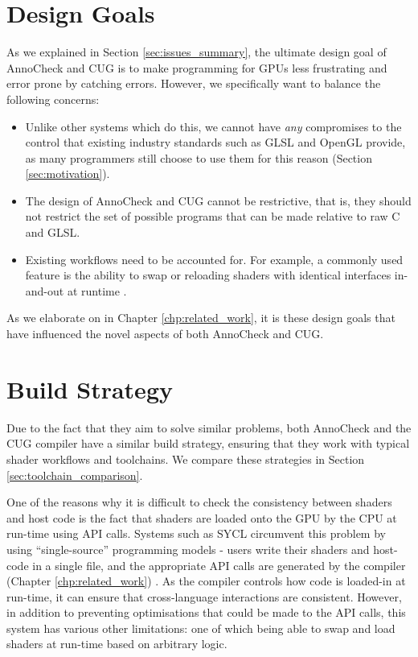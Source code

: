 \documentclass[a4paper,12pt,twoside,openright]{report}
\begin{document}
\section{Design Goals}

As we explained in Section \ref{sec:issues_summary}, the ultimate design goal
of AnnoCheck and CUG is to make programming for GPUs less frustrating and error
prone by catching errors. However, we specifically want to balance the
following concerns:

\begin{itemize}

    \item Unlike other systems which do this, we cannot have \textit{any}
    compromises to the control that existing industry standards such as GLSL
    and OpenGL provide, as many programmers still choose to use them for this
    reason (Section \ref{sec:motivation}).

    \item The design of AnnoCheck and CUG cannot be restrictive, that is, they
    should not restrict the set of possible programs that can be made relative
    to raw C and GLSL.

    \item Existing workflows need to be accounted for. For example, a commonly
    used feature is the ability to swap or reloading shaders with identical
    interfaces in-and-out at runtime \cite{HotloadShader}.

\end{itemize}

As we elaborate on in Chapter \ref{chp:related_work}, it is these design goals
that have influenced the novel aspects of both AnnoCheck and CUG.

\section{Build Strategy}

\label{sec:build_strategy}

Due to the fact that they aim to solve similar problems, both AnnoCheck and the
CUG compiler have a similar build strategy, ensuring that they work with
typical shader workflows and toolchains. We compare these strategies in Section
\ref{sec:toolchain_comparison}.

One of the reasons why it is difficult to check the consistency between shaders
and host code is the fact that shaders are loaded onto the GPU by the CPU at
run-time using API calls. Systems such as SYCL circumvent this problem by using
``single-source'' programming models - users write their shaders and host-code
in a single file, and the appropriate API calls are generated by the compiler
(Chapter \ref{chp:related_work}) \cite{SYCL}. As the compiler controls how code
is loaded-in at run-time, it can ensure that cross-language interactions are
consistent. However, in addition to preventing optimisations that could be made
to the API calls, this system has various other limitations: one of which being
able to swap and load shaders at run-time based on arbitrary logic.
\end{document}
